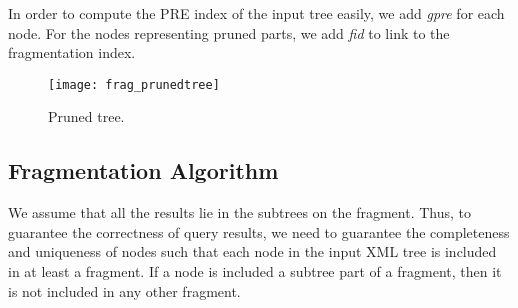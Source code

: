 In order to compute the PRE index of the input tree easily, we add
\emph{gpre} for each node.  For the nodes representing pruned parts,
we add \emph{fid} to link to the fragmentation index.

\begin{figure}[t]  
	\centering
	\texttt{[image: frag\_prunedtree]}
	\caption{Pruned tree.}
	\label{fig:frag_prunedtree}	
\end{figure}






\subsection{Fragmentation Algorithm}

We assume that all the results lie in the subtrees on the fragment. Thus,
to guarantee the correctness of query results, we need to guarantee the
completeness and uniqueness of nodes such that each node in the input XML tree
is included in at least a fragment. If a node is included a subtree part of a
fragment, then it is not included in any other fragment. 




